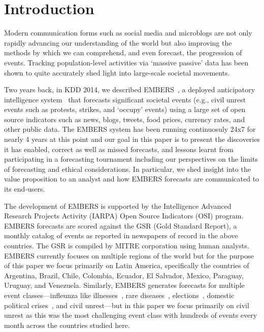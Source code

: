 \section{Introduction}
Modern communication forms such as social media and microblogs are not only rapidly
advancing our understanding of the world but also improving the methods by which we can 
comprehend, and even forecast, the progression of events.
Tracking population-level activities via `massive passive' data has been shown to 
quite accurately shed light into large-scale societal movements. 

Two years back, in KDD 2014, we described EMBERS~\cite{beatingthenews-kdd}, a deployed anticipatory
intelligence system~\cite{bigdata-andy-doyle-embers-paper} that forecasts significant 
societal events (e.g., civil unrest
events such as protests, strikes, and `occupy' events) using a large set of open source
indicators such as news, blogs, tweets, food prices, currency rates, and other public
data. The EMBERS system has been running continuosuly 24x7 for nearly 4 years at this point
and our goal in this paper is to present the discoveries it has enabled,
correct as well as missed
forecasts, and lessons learnt from participating in a forecasting tournament including
our perspectives on the limits of forecasting and ethical considerations. In
particular, we shed insight into the value proposition to an analyst and how EMBERS forecasts
are communicated to its end-users. 

The development of EMBERS is supported by the Intelligence Advanced Research Projects
Activity (IARPA) Open Source Indicators (OSI) program. 
EMBERS forecasts are scored against the GSR (Gold Standard Report), a monthly catalog of 
events as reported in newspapers of record in the above countries. The GSR is compiled by MITRE corporation
using human analysts.
EMBERS currently focuses on multiple regions of the world but for the purpose of this paper
we focus primarily on Latin America, specifically the countries of
Argentina, Brazil, Chile, Colombia, Ecuador, El Salvador, Mexico, Paraguay, Uruguay, and Venezuela.
Similarly, EMBERS generates forecasts for multiple event classes---infleunza like illnesses~\cite{prithwish-ili},
rare diseases~\cite{sdm-saurav}, elections~\cite{aravindan-wei-besc}, domestic political crises~\cite{gdelt-acm-webscience}, and civil unrest---but in this paper we focus primarily on civil unrest as this was the
most challenging event class with hundreds of events every month across the countries studied here.

